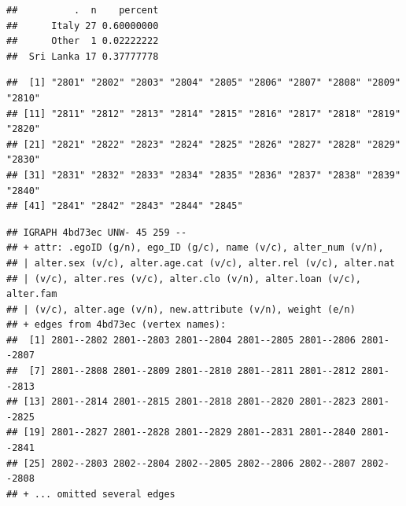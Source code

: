 \documentclass[
]{book}
\newenvironment{Shaded}{\begin{snugshade}}{\end{snugshade}}
\newcommand{\CommentTok}[1]{\textcolor[rgb]{0.56,0.35,0.01}{\textit{#1}}}
\newcommand{\DecValTok}[1]{\textcolor[rgb]{0.00,0.00,0.81}{#1}}
\newcommand{\FunctionTok}[1]{\textcolor[rgb]{0.00,0.00,0.00}{#1}}
\newcommand{\NormalTok}[1]{#1}
\newcommand{\OtherTok}[1]{\textcolor[rgb]{0.56,0.35,0.01}{#1}}
\newcommand{\SpecialCharTok}[1]{\textcolor[rgb]{0.00,0.00,0.00}{#1}}
\begin{document}
\begin{Shaded}
\end{Shaded}

\begin{verbatim}
##          .  n    percent
##      Italy 27 0.60000000
##      Other  1 0.02222222
##  Sri Lanka 17 0.37777778
\end{verbatim}

\begin{Shaded}
\end{Shaded}

\begin{verbatim}
##  [1] "2801" "2802" "2803" "2804" "2805" "2806" "2807" "2808" "2809" "2810"
## [11] "2811" "2812" "2813" "2814" "2815" "2816" "2817" "2818" "2819" "2820"
## [21] "2821" "2822" "2823" "2824" "2825" "2826" "2827" "2828" "2829" "2830"
## [31] "2831" "2832" "2833" "2834" "2835" "2836" "2837" "2838" "2839" "2840"
## [41] "2841" "2842" "2843" "2844" "2845"
\end{verbatim}

\begin{Shaded}
\end{Shaded}

\begin{verbatim}
## IGRAPH 4bd73ec UNW- 45 259 -- 
## + attr: .egoID (g/n), ego_ID (g/c), name (v/c), alter_num (v/n),
## | alter.sex (v/c), alter.age.cat (v/c), alter.rel (v/c), alter.nat
## | (v/c), alter.res (v/c), alter.clo (v/n), alter.loan (v/c), alter.fam
## | (v/c), alter.age (v/n), new.attribute (v/n), weight (e/n)
## + edges from 4bd73ec (vertex names):
##  [1] 2801--2802 2801--2803 2801--2804 2801--2805 2801--2806 2801--2807
##  [7] 2801--2808 2801--2809 2801--2810 2801--2811 2801--2812 2801--2813
## [13] 2801--2814 2801--2815 2801--2818 2801--2820 2801--2823 2801--2825
## [19] 2801--2827 2801--2828 2801--2829 2801--2831 2801--2840 2801--2841
## [25] 2802--2803 2802--2804 2802--2805 2802--2806 2802--2807 2802--2808
## + ... omitted several edges
\end{verbatim}
\end{document}
